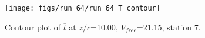 \begin{figure}[H]
\centering
\texttt{[image: figs/run\_64/run\_64\_T\_contour]}
\caption{Contour plot of $\overline{t}$ at $z/c$=10.00, $V_{free}$=21.15, station 7.}
\end{figure}


